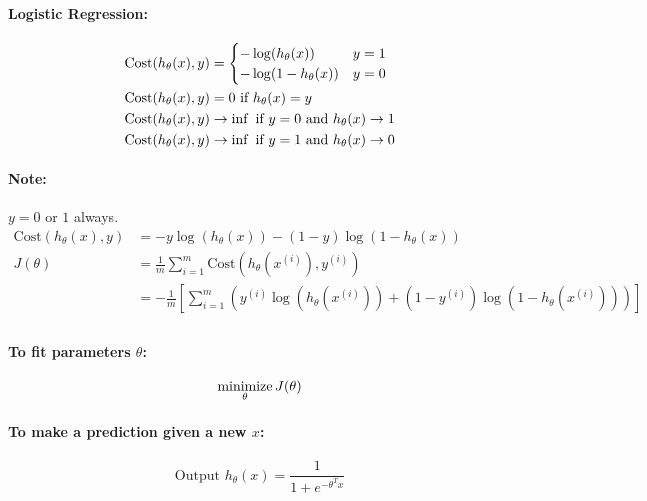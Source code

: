 \paragraph{Logistic Regression:}
\begin{align*}
    \mathrm{Cost}(h_\theta(x), y) & = \begin{cases}
        -\log(h_\theta(x))     & y = 1 \\
        -\log(1 - h_\theta(x)) & y = 0 \\
    \end{cases}     \\
    \mathrm{Cost}(h_\theta(x), y) & = 0 \text{ if } h_\theta(x) = y \\
    \mathrm{Cost}(h_\theta(x), y) &
    \rightarrow \inf \text{ if } y = 0 \text{ and } h_\theta(x) \rightarrow 1 \\
    \mathrm{Cost}(h_\theta(x), y) &
    \rightarrow \inf \text{ if } y = 1 \text{ and } h_\theta(x) \rightarrow 0 \\
\end{align*}

\paragraph{Note:} $y = 0$ or $1$ always.
\begin{align*}
    \mathrm{Cost}(h_\theta(x), y) &
    = -y\log(h_\theta(x)) - (1-y)\log(1 - h_\theta(x))                              \\
    J(\theta)                     &
    = \frac{1}{m}\sum_{i = 1}^m\mathrm{Cost}\left(h_\theta(x^{(i)}), y^{(i)}\right) \\
                                  &
    = -\frac{1}{m}\left[
        \sum_{i=1}^m\left(
        y^{(i)}\log(h_\theta(x^{(i)})) + (1 - y^{(i)})\log(1 - h_\theta(x^{(i)}))
        \right)
        \right]                                                                     \\
\end{align*}

\paragraph{To fit parameters $\theta$:}
\begin{equation*}
    \operatorname*{minimize}_\theta J(\theta)
\end{equation*}

\paragraph{To make a prediction given a new $x$:}
\begin{equation*}
    \text{Output } h_\theta(x) = \frac{1}{1 + e^{-\theta^Tx}}
\end{equation*}

